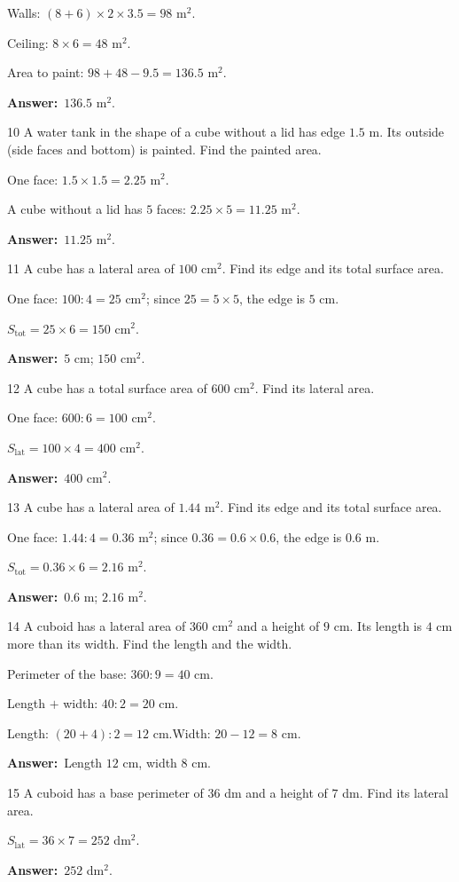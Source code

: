 \documentclass[11pt]{article}
\newif\ifsol \solfalse
\providecommand{\AnsWord}{Đáp số}
\newcommand{\dapso}[1]{\par\textbf{\AnsWord:}\ #1}
\newcommand{\probsol}[1]{%
  \begin{lrbox}{\solmeasure}\begin{minipage}{\dimexpr\linewidth-24pt\relax}#1\end{minipage}\end{lrbox}%
  \ifsol
    \begin{solbox}#1\end{solbox}%
  \else
    \setlength{\solht}{\dimexpr\ht\solmeasure+\dp\solmeasure+0.85cm\relax}%
    \ifdim\solht<1.35cm\setlength{\solht}{1.35cm}\fi
    \begin{tcolorbox}[colback=white,colframe=Line,boxrule=0.8pt,arc=5pt,
      left=8pt,right=8pt,top=4pt,bottom=4pt,height=\solht]{\footnotesize\color{Slate}\itshape\WorkWord}\end{tcolorbox}%
  \fi}
\newcommand{\gap}{\vspace{0.3cm}}
\def\WorkWord{Your work:}
\def\AnsWord{Answer}
\begin{document}
\probsol{
Walls: $(8+6)\times2\times3.5=98$ m$^2$.\par
Ceiling: $8\times6=48$ m$^2$.\par
Area to paint: $98+48-9.5=136.5$ m$^2$.
\dapso{$136.5$ m$^2$.}}
\gap
\begin{probbox}{10}{\relax}
A water tank in the shape of a cube without a lid has edge $1.5$ m. Its outside (side faces and bottom) is painted. Find the painted area.
\end{probbox}
\probsol{
One face: $1.5\times1.5=2.25$ m$^2$.\par
A cube without a lid has $5$ faces: $2.25\times5=11.25$ m$^2$.
\dapso{$11.25$ m$^2$.}}
\gap
\begin{probbox}{11}{\relax}
A cube has a lateral area of $100$ cm$^2$. Find its edge and its total surface area.
\end{probbox}
\probsol{
One face: $100:4=25$ cm$^2$; since $25=5\times5$, the edge is $5$ cm.\par
$S_{\text{tot}}=25\times6=150$ cm$^2$.
\dapso{$5$ cm; $150$ cm$^2$.}}
\gap
\begin{probbox}{12}{\relax}
A cube has a total surface area of $600$ cm$^2$. Find its lateral area.
\end{probbox}
\probsol{
One face: $600:6=100$ cm$^2$.\par
$S_{\text{lat}}=100\times4=400$ cm$^2$.
\dapso{$400$ cm$^2$.}}
\gap
\begin{probbox}{13}{\relax}
A cube has a lateral area of $1.44$ m$^2$. Find its edge and its total surface area.
\end{probbox}
\probsol{
One face: $1.44:4=0.36$ m$^2$; since $0.36=0.6\times0.6$, the edge is $0.6$ m.\par
$S_{\text{tot}}=0.36\times6=2.16$ m$^2$.
\dapso{$0.6$ m; $2.16$ m$^2$.}}
\gap
\begin{probbox}{14}{\relax}
A cuboid has a lateral area of $360$ cm$^2$ and a height of $9$ cm. Its length is $4$ cm more than its width. Find the length and the width.
\end{probbox}
\probsol{
Perimeter of the base: $360:9=40$ cm.\par
Length $+$ width: $40:2=20$ cm.\par
Length: $(20+4):2=12$ cm.\quad Width: $20-12=8$ cm.
\dapso{Length $12$ cm, width $8$ cm.}}
\gap
\begin{probbox}{15}{\relax}
A cuboid has a base perimeter of $36$ dm and a height of $7$ dm. Find its lateral area.
\end{probbox}
\probsol{
$S_{\text{lat}}=36\times7=252$ dm$^2$.
\dapso{$252$ dm$^2$.}}
\end{document}
